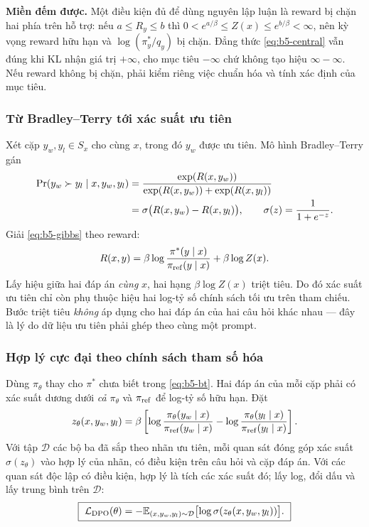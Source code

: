 \textbf{Miền đếm được.} Một điều kiện đủ để dùng nguyên lập luận là reward bị chặn
hai phía trên hỗ trợ: nếu $a\le R_y\le b$ thì
$0<e^{a/\beta}\le Z(x)\le e^{b/\beta}<\infty$, nên kỳ vọng reward hữu hạn và
$\log(\pi_y^*/q_y)$ bị chặn. Đẳng thức \eqref{eq:b5-central} vẫn đúng khi KL nhận
giá trị $+\infty$, cho mục tiêu $-\infty$ chứ không tạo hiệu $\infty-\infty$. Nếu
reward không bị chặn, phải kiểm riêng việc chuẩn hóa và tính xác định của mục tiêu.

\subsubsection{Từ Bradley--Terry tới xác suất ưu tiên}

Xét cặp $y_w,y_l\in S_x$ cho cùng $x$, trong đó $y_w$ được ưu tiên. Mô hình
Bradley--Terry gán
\begin{align}
  \Pr(y_w\succ y_l\mid x,y_w,y_l)
   &=\frac{\exp(R(x,y_w))}{\exp(R(x,y_w))+\exp(R(x,y_l))}\notag\\
   &=\sigma\bigl(R(x,y_w)-R(x,y_l)\bigr),
   \qquad \sigma(z)=\frac{1}{1+e^{-z}}.
  \label{eq:b5-bt}
\end{align}
Giải \eqref{eq:b5-gibbs} theo reward:
\begin{equation}
  R(x,y)=\beta\log\frac{\pi^*(y\mid x)}{\pi_{\mathrm{ref}}(y\mid x)}+\beta\log Z(x).
  \label{eq:b5-invert}
\end{equation}
Lấy hiệu giữa hai đáp án \emph{cùng} $x$, hai hạng $\beta\log Z(x)$ triệt tiêu. Do
đó xác suất ưu tiên chỉ còn phụ thuộc hiệu hai log-tỷ số chính sách tối ưu trên
tham chiếu. Bước triệt tiêu \emph{không} áp dụng cho hai đáp án của hai câu hỏi
khác nhau --- đây là lý do dữ liệu ưu tiên phải ghép theo cùng một prompt.

\subsubsection{Hợp lý cực đại theo chính sách tham số hóa}

Dùng $\pi_\theta$ thay cho $\pi^*$ chưa biết trong \eqref{eq:b5-bt}. Hai đáp án của
mỗi cặp phải có xác suất dương dưới \emph{cả} $\pi_\theta$ và $\pi_{\mathrm{ref}}$ để log-tỷ số
hữu hạn. Đặt
\begin{equation}
  z_\theta(x,y_w,y_l)
   =\beta\left[
      \log\frac{\pi_\theta(y_w\mid x)}{\pi_{\mathrm{ref}}(y_w\mid x)}
      -\log\frac{\pi_\theta(y_l\mid x)}{\pi_{\mathrm{ref}}(y_l\mid x)}
   \right].
  \label{eq:b5-logit}
\end{equation}
Với tập $\mathcal D$ các bộ ba đã sắp theo nhãn ưu tiên, mỗi quan sát đóng góp xác
suất $\sigma(z_\theta)$ vào hợp lý của nhãn, có điều kiện trên câu hỏi và cặp đáp
án. Với các quan sát độc lập có điều kiện, hợp lý là tích các xác suất đó; lấy log,
đổi dấu và lấy trung bình trên $\mathcal D$:
\begin{equation}
  \boxed{\ \mathcal L_{\mathrm{DPO}}(\theta)
    =-\mathbb{E}_{(x,y_w,y_l)\sim\mathcal D}\bigl[\log\sigma(z_\theta(x,y_w,y_l))\bigr].\ }
  \label{eq:b5-loss}
\end{equation}

